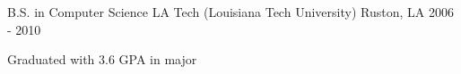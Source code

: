 

\begin{cventries}

  \cventry
    {B.S. in Computer Science} %
    {LA Tech (Louisiana Tech University)} %
    {Ruston, LA} %
    {2006 - 2010} %
    {
      \begin{cvitems} %
        \item {Graduated with 3.6 GPA in major}
      \end{cvitems}
    }

\end{cventries}
